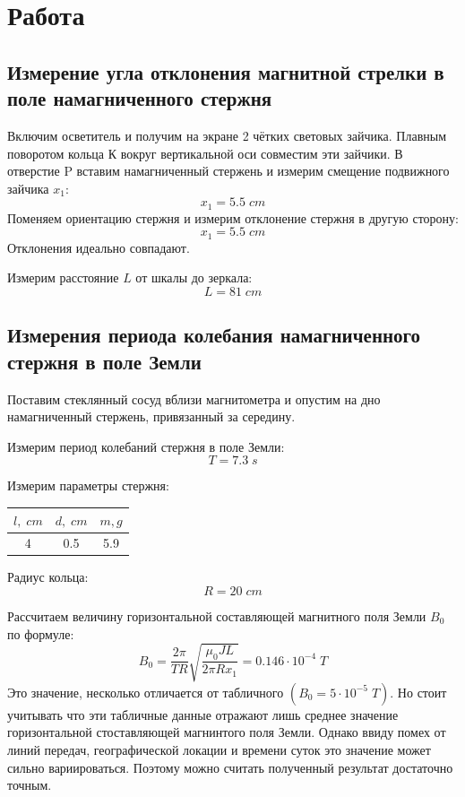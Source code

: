 \documentclass{article}
\begin{document}
\section{Работа}
\subsection{Измерение угла отклонения магнитной стрелки в поле намагниченного стержня}
Включим осветитель и получим на экране 2 чётких световых зайчика. Плавным поворотом кольца К вокруг вертикальной
оси совместим эти зайчики. В отверстие P вставим намагниченный стержень и измерим смещение подвижного зайчика \(x_1\):
\[ x_1 = 5.5\; cm \]
Поменяем ориентацию стержня и измерим отклонение стержня в другую сторону:
\[ x_1 = 5.5\; cm \]
Отклонения идеально совпадают.

Измерим расстояние \(L\) от шкалы до зеркала:
\[ L = 81\; cm \]

\subsection{Измерения периода колебания намагниченного стержня в поле Земли}

Поставим стеклянный сосуд вблизи магнитометра и опустим на дно намагниченный стержень, привязанный за середину.

Измерим период колебаний стержня в поле Земли:
\[ T = 7.3\; s\]

Измерим параметры стержня:
\begin{table}[H]
    \centering
    \begin{tabular}{|c|c|c|}
    \hline
    \(l,\; cm\) & \(d, \; cm\) & \(m, g\) \\\hline
    4 & 0.5 & 5.9 \\\hline        
    \end{tabular}
\end{table}

Радиус кольца:
\[ R = 20\; cm \]

Рассчитаем величину горизонтальной составляющей магнитного поля Земли \(B_0\) по формуле:
\[ B_0 = \frac{2\pi}{TR}\sqrt{\frac{\mu_0JL}{2\pi Rx_1}} = 0.146\cdot10^{-4}\; T \]
Это значение, несколько отличается от табличного \((B_0 = 5\cdot10^{-5}\; T)\). Но стоит учитывать что эти табличные данные
отражают лишь среднее значение горизонтальной стоставляющей магнинтого поля Земли. Однако ввиду помех от линий передач,
географической локации и времени суток это значение может сильно вариироваться. Поэтому можно считать полученный результат
достаточно точным.
\end{document}
